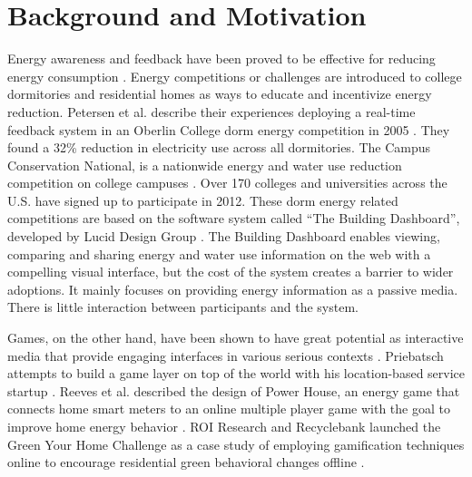 \documentclass{acm_proc_article-sp}
\begin{document}
\section{Background and Motivation}
%

Energy awareness and feedback have been proved to be effective for reducing energy consumption \cite{darby-review-2006}. Energy competitions or challenges are introduced to college dormitories and residential homes as ways to educate and incentivize energy reduction. Petersen et al. describe their experiences deploying a real-time feedback
system in an Oberlin College dorm energy competition in 2005 \cite{petersen-dorm-energy-reduction}. They found a 32\% reduction in electricity use across all dormitories. The Campus Conservation National, is a nationwide energy and water use reduction competition on college campuses \cite{competetoreduce}. Over 170 colleges and universities across the U.S. have signed up to participate in 2012. These dorm energy related competitions are based on the software system called ``The Building Dashboard'', developed by Lucid Design Group \cite{building-dashboard}. The Building Dashboard enables viewing, comparing and sharing energy and water use information on the web with a compelling visual interface, but the cost of the system creates a barrier to wider adoptions. It mainly focuses on providing energy information as a passive media. There is little interaction between participants and the system.

Games, on the other hand, have been shown to have great potential as interactive media that provide engaging interfaces in various serious contexts \cite{mcgonigal2011reality}. Priebatsch attempts to build a game layer on top of the world with his location-based service startup \cite{Priebatsch2010ted}. Reeves et al. described the design of Power House, an energy game that connects home smart meters to an online multiple player game with the goal to improve home energy behavior \cite{Reeves2011powerhouse}.  ROI Research and Recyclebank launched the Green Your Home Challenge as a case study of employing gamification techniques online to encourage residential green behavioral changes offline \cite{gamingforgood}. 
\end{document}
